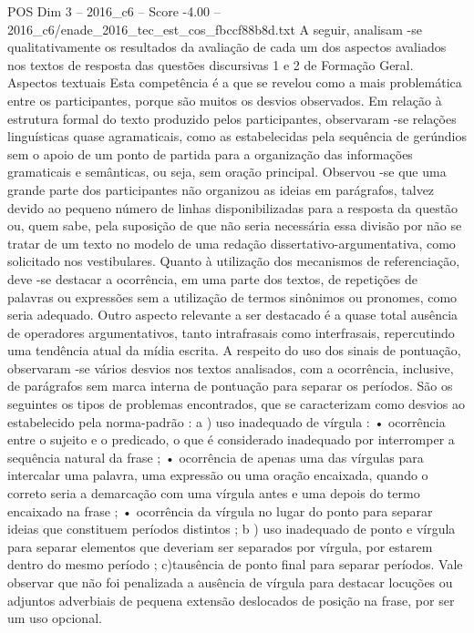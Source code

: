 \begin{textsample}{POS Dim 3 – 2016\_c6 – Score -4.00 – 2016\_c6/enade\_2016\_tec\_est\_cos\_fbccf88b8d.txt}
A seguir, analisam -se qualitativamente os resultados da avaliação de cada um dos aspectos avaliados nos textos de resposta das questões discursivas 1 e 2 de Formação Geral.
Aspectos textuais Esta competência é a que se revelou como a mais problemática entre os participantes, porque são muitos os desvios observados.
Em relação à estrutura formal do texto produzido pelos participantes, observaram -se relações linguísticas quase agramaticais, como as estabelecidas pela sequência de gerúndios sem o apoio de um ponto de partida para a organização das informações gramaticais e semânticas, ou seja, sem oração principal.
Observou -se que uma grande parte dos participantes não organizou as ideias em parágrafos, talvez devido ao pequeno número de linhas disponibilizadas para a resposta da questão ou, quem sabe, pela suposição de que não seria necessária essa divisão por não se tratar de um texto no modelo de uma redação dissertativo-argumentativa, como solicitado nos vestibulares.
Quanto à utilização dos mecanismos de referenciação, deve -se destacar a ocorrência, em uma parte dos textos, de repetições de palavras ou expressões sem a utilização de termos sinônimos ou pronomes, como seria adequado.
Outro aspecto relevante a ser destacado é a quase total ausência de operadores argumentativos, tanto intrafrasais como interfrasais, repercutindo uma tendência atual da mídia escrita.
A respeito do uso dos sinais de pontuação, observaram -se vários desvios nos textos analisados, com a ocorrência, inclusive, de parágrafos sem marca interna de pontuação para separar os períodos.
São os seguintes os tipos de problemas encontrados, que se caracterizam como desvios ao estabelecido pela norma-padrão : a ) uso inadequado de vírgula : • ocorrência entre o sujeito e o predicado, o que é considerado inadequado por interromper a sequência natural da frase ; • ocorrência de apenas uma das vírgulas para intercalar uma palavra, uma expressão ou uma oração encaixada, quando o correto seria a demarcação com uma vírgula antes e uma depois do termo encaixado na frase ; • ocorrência da vírgula no lugar do ponto para separar ideias que constituem períodos distintos ; b ) uso inadequado de ponto e vírgula para separar elementos que deveriam ser separados por vírgula, por estarem dentro do mesmo período ; c)tausência de ponto final para separar períodos.
Vale observar que não foi penalizada a ausência de vírgula para destacar locuções ou adjuntos adverbiais de pequena extensão deslocados de posição na frase, por ser um uso opcional.

\end{textsample}
